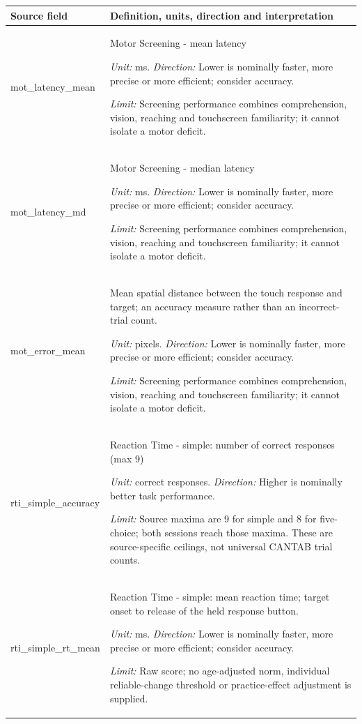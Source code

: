 \begin{longtable}{p{.26\linewidth}p{.66\linewidth}}
\toprule Source field & Definition, units, direction and interpretation \\
\midrule\endhead
{\ttfamily\footnotesize mot\_\allowbreak{}latency\_\allowbreak{}mean} & Motor Screening - mean latency\par\textit{Unit:} ms. \textit{Direction:} Lower is nominally faster, more precise or more efficient; consider accuracy.\par\textit{Limit:} Screening performance combines comprehension, vision, reaching and touchscreen familiarity; it cannot isolate a motor deficit. \\[7pt]
{\ttfamily\footnotesize mot\_\allowbreak{}latency\_\allowbreak{}md} & Motor Screening - median latency\par\textit{Unit:} ms. \textit{Direction:} Lower is nominally faster, more precise or more efficient; consider accuracy.\par\textit{Limit:} Screening performance combines comprehension, vision, reaching and touchscreen familiarity; it cannot isolate a motor deficit. \\[7pt]
{\ttfamily\footnotesize mot\_\allowbreak{}error\_\allowbreak{}mean} & Mean spatial distance between the touch response and target; an accuracy measure rather than an incorrect-trial count.\par\textit{Unit:} pixels. \textit{Direction:} Lower is nominally faster, more precise or more efficient; consider accuracy.\par\textit{Limit:} Screening performance combines comprehension, vision, reaching and touchscreen familiarity; it cannot isolate a motor deficit. \\[7pt]
{\ttfamily\footnotesize rti\_\allowbreak{}simple\_\allowbreak{}accuracy} & Reaction Time - simple: number of correct responses (max 9)\par\textit{Unit:} correct responses. \textit{Direction:} Higher is nominally better task performance.\par\textit{Limit:} Source maxima are 9 for simple and 8 for five-choice; both sessions reach those maxima. These are source-specific ceilings, not universal CANTAB trial counts. \\[7pt]
{\ttfamily\footnotesize rti\_\allowbreak{}simple\_\allowbreak{}rt\_\allowbreak{}mean} & Reaction Time - simple: mean reaction time; target onset to release of the held response button.\par\textit{Unit:} ms. \textit{Direction:} Lower is nominally faster, more precise or more efficient; consider accuracy.\par\textit{Limit:} Raw score; no age-adjusted norm, individual reliable-change threshold or practice-effect adjustment is supplied. \\[7pt]

\end{longtable}
